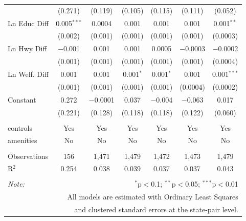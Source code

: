 \begin{table}[!htbp]
\begin{tabular}{@{\extracolsep{5pt}}lcccccc}
  & (0.271) & (0.119) & (0.105) & (0.115) & (0.111) & (0.052) \\ 
  Ln Educ Diff & 0.005$^{***}$ & 0.0004 & 0.001 & 0.001 & 0.001 & 0.001$^{**}$ \\ 
  & (0.002) & (0.001) & (0.001) & (0.001) & (0.001) & (0.0003) \\ 
  Ln Hwy Diff & $-$0.001 & 0.001 & 0.001 & 0.0005 & $-$0.0003 & $-$0.0002 \\ 
  & (0.001) & (0.001) & (0.001) & (0.001) & (0.001) & (0.0004) \\ 
  Ln Welf. Diff & 0.001 & 0.001 & 0.001$^{*}$ & 0.001$^{*}$ & 0.001 & 0.001$^{***}$ \\ 
  & (0.001) & (0.001) & (0.001) & (0.001) & (0.0004) & (0.0002) \\ 
  Constant & 0.272 & $-$0.0001 & 0.037 & $-$0.004 & $-$0.063 & 0.017 \\ 
  & (0.221) & (0.128) & (0.118) & (0.118) & (0.122) & (0.060) \\ 
 \hline \\[-1.8ex] 
controls & Yes & Yes & Yes & Yes & Yes & Yes \\ 
amenities & No & No & No & No & No & No \\ 
\hline \\[-1.8ex] 
Observations & 156 & 1,471 & 1,479 & 1,472 & 1,473 & 1,479 \\ 
R$^{2}$ & 0.254 & 0.038 & 0.039 & 0.037 & 0.037 & 0.043 \\ 
\hline 
\hline \\[-1.8ex] 
\textit{Note:}  & \multicolumn{6}{r}{$^{*}$p$<$0.1; $^{**}$p$<$0.05; $^{***}$p$<$0.01} \\ 
 & \multicolumn{6}{r}{All models are estimated with Ordinary Least Squares} \\ 
 & \multicolumn{6}{r}{and clustered standard errors at the state-pair level.} \\ 
\end{tabular} 
\end{table} 
